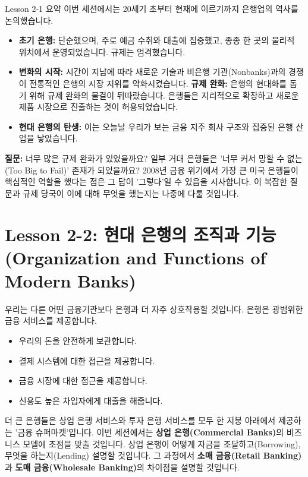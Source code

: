 \documentclass[11pt,a4paper]{article}
\theoremstyle{definition}
\begin{document}
\begin{summarybox}{Lesson 2-1 요약}
이번 세션에서는 20세기 초부터 현재에 이르기까지 은행업의 역사를 논의했습니다.
\begin{itemize}
    \item \textbf{초기 은행:} 단순했으며, 주로 예금 수취와 대출에 집중했고, 종종 한 곳의 물리적 위치에서 운영되었습니다. 규제는 엄격했습니다.
    \item \textbf{변화의 시작:} 시간이 지남에 따라 새로운 기술과 비은행 기관(Nonbanks)과의 경쟁이 전통적인 은행의 시장 지위를 약화시켰습니다.
    \textbf{규제 완화:} 은행의 현대화를 돕기 위해 규제 완화의 물결이 뒤따랐습니다. 은행들은 지리적으로 확장하고 새로운 제품 시장으로 진출하는 것이 허용되었습니다.
    \item \textbf{현대 은행의 탄생:} 이는 오늘날 우리가 보는 금융 지주 회사 구조와 집중된 은행 산업을 낳았습니다.
\end{itemize}
\textbf{질문:} 너무 많은 규제 완화가 있었을까요? 일부 거대 은행들은 '너무 커서 망할 수 없는(Too Big to Fail)' 존재가 되었을까요? 2008년 금융 위기에서 가장 큰 미국 은행들이 핵심적인 역할을 했다는 점은 그 답이 '그렇다'일 수 있음을 시사합니다. 이 복잡한 질문과 규제 당국이 이에 대해 무엇을 했는지는 나중에 다룰 것입니다.
\end{summarybox}

\newpage
\section{Lesson 2-2: 현대 은행의 조직과 기능 (Organization and Functions of Modern Banks)}

우리는 다른 어떤 금융기관보다 은행과 더 자주 상호작용할 것입니다. 은행은 광범위한 금융 서비스를 제공합니다.
\begin{itemize}
    \item 우리의 돈을 안전하게 보관합니다.
    \item 결제 시스템에 대한 접근을 제공합니다.
    \item 금융 시장에 대한 접근을 제공합니다.
    \item 신용도 높은 차입자에게 대출을 해줍니다.
\end{itemize}
더 큰 은행들은 상업 은행 서비스와 투자 은행 서비스를 모두 한 지붕 아래에서 제공하는 '금융 슈퍼마켓'입니다. 이번 세션에서는 \textbf{상업 은행(Commercial Banks)}의 비즈니스 모델에 초점을 맞출 것입니다. 상업 은행이 어떻게 자금을 조달하고(Borrowing), 무엇을 하는지(Lending) 설명할 것입니다. 그 과정에서 \textbf{소매 금융(Retail Banking)}과 \textbf{도매 금융(Wholesale Banking)}의 차이점을 설명할 것입니다.
\end{document}
